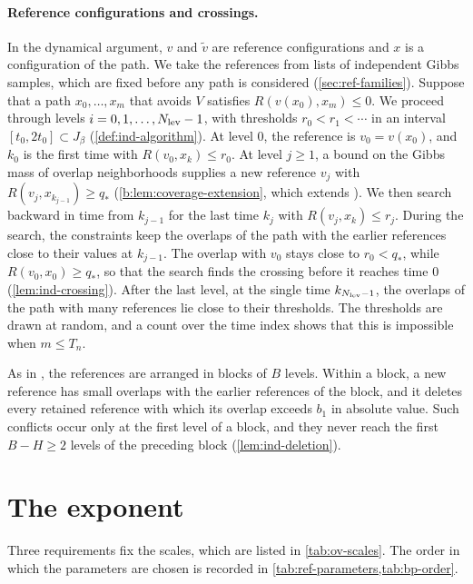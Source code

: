 \paragraph{Reference configurations and crossings.} In the dynamical argument,
$v$ and ${\widetilde v}$ are reference configurations and $x$ is a configuration of the
path. We take the references from lists of independent Gibbs samples, which
are fixed before any path is considered (\cref{sec:ref-families}). Suppose that
a path $x_0,\dots,x_m$ that avoids $V$ satisfies $R(v(x_0),x_m)\le0$. We
proceed through levels $i=0,1,\dots,N_{\rm lev}-1$, with thresholds
$r_0<r_1<\cdots$ in an interval $[t_0,2t_0]\subset J_\beta$
(\cref{def:ind-algorithm}). At level $0$, the reference is $v_0=v(x_0)$, and
$k_0$ is the first time with $R(v_0,x_k)\le r_0$. At level $j\ge1$, a bound
on the Gibbs mass of overlap neighborhoods supplies a new reference $v_j$ with
$R(v_j,x_{k_{j-1}})\ge q_*$ (\cref{b:lem:coverage-extension}, which extends
\cite[Proposition~6.1]{oai-barriers}). We then search backward in time from
$k_{j-1}$ for the last time $k_j$ with $R(v_j,x_k)\le r_j$. During the
search, the constraints keep the overlaps of the path with the earlier
references close to their values at $k_{j-1}$. The overlap
with $v_0$ stays close to $r_0<q_*$, while $R(v_0,x_0)\ge q_*$, so that the
search finds the crossing before it reaches time $0$ (\cref{lem:ind-crossing}).
After the last level, at the single time $k_{N_{\rm lev}-1}$, the overlaps
of the path with many references lie close to their thresholds. The
thresholds are drawn at random, and a count over the time index shows that this
is impossible when $m\le T_n$.

As in \cite[Sections~8.3 and~8.4]{oai-barriers}, the references are arranged
in blocks of $B$ levels. Within a block, a new reference has small overlaps with
the earlier references of the block, and it deletes every retained reference
with which its overlap exceeds $b_1$ in absolute value. Such conflicts occur
only at the first level of a block, and they never reach the first $B-H\ge2$
levels of the preceding block (\cref{lem:ind-deletion}).

\section{The exponent}\label{sec:ov-scales}

Three requirements fix the scales, which are listed in \cref{tab:ov-scales}.
The order in which the parameters are chosen is recorded in
\cref{tab:ref-parameters,tab:bp-order}.

